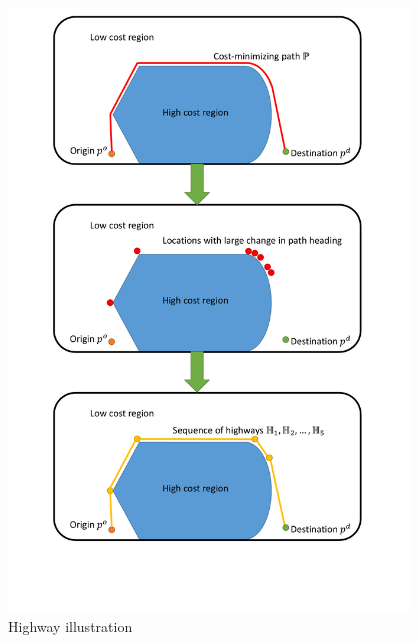 \begin{figure}
	\centering
	\includegraphics[width=0.95\textwidth]{"fig/highway_illustration"}
	\caption{Highway illustration}
	\label{fig:hw_ill}
\end{figure}